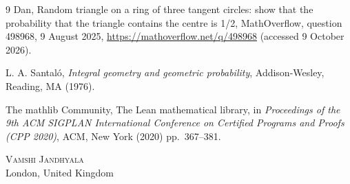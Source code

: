 \documentclass[11pt]{article}
\theoremstyle{remark}
\begin{document}
\begin{thebibliography}{9}
Dan, Random triangle on a ring of three tangent circles: show that the probability that the
triangle contains the centre is 1/2, MathOverflow, question 498968, 9 August 2025,
\url{https://mathoverflow.net/q/498968} (accessed 9 October 2026).

L. A. Santal\'o, \emph{Integral geometry and geometric probability}, Addison-Wesley, Reading, MA
(1976).

The mathlib Community, The Lean mathematical library, in \emph{Proceedings of the 9th ACM SIGPLAN
International Conference on Certified Programs and Proofs (CPP 2020)}, ACM, New York (2020)
pp.~367--381.
\end{thebibliography}

\vspace{1em}
\noindent\textsc{Vamshi Jandhyala}\\
London, United Kingdom
\end{document}
